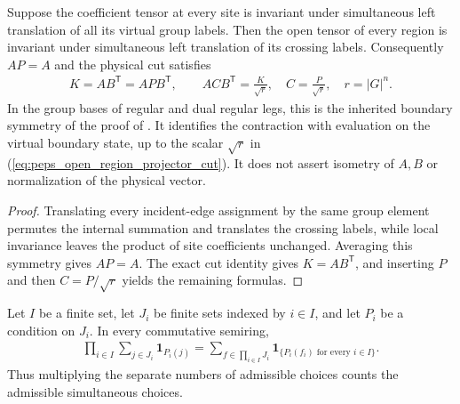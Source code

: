 \begin{lemma}%
    \label{thm:peps_regular_open_region_projector}
    \leanok
    Suppose the coefficient tensor at every site is invariant under
    simultaneous left translation of all its virtual group labels.
    Then the open tensor of every region is invariant under
    simultaneous left translation of its crossing labels. Consequently
    $AP=A$ and the physical cut satisfies
    \begin{align}
        K=AB^{\mathsf T}=APB^{\mathsf T},\qquad
        ACB^{\mathsf T}=\frac{K}{\sqrt r},
        \quad C=\frac P{\sqrt r},\quad r=|G|^n.
        \label{eq:peps_open_region_projector_cut}
    \end{align}
    In the group bases of regular and dual regular legs, this is the
    inherited boundary symmetry of the proof of
    \cite[Theorem~6.9]{Schuch2010PEPS}. It identifies the contraction
    with evaluation on the virtual boundary state, up to the scalar
    $\sqrt r$ in (\ref{eq:peps_open_region_projector_cut}). It does not assert isometry of $A,B$ or normalization of
    the physical vector.
\end{lemma}
\begin{proof}\leanok
    Translating every incident-edge assignment by the same group element
    permutes the internal summation and translates the crossing
    labels, while local invariance leaves the product of site coefficients
    unchanged. Averaging this symmetry gives $AP=A$. The exact cut
    identity gives $K=AB^{\mathsf T}$, and inserting $P$ and then
    $C=P/\sqrt r$ yields the remaining formulas.
\end{proof}

\begin{lemma}%
    \label{thm:peps_finite_indicator_sum}
    \leanok
    Let $I$ be a finite set, let $J_i$ be finite sets indexed by $i\in I$,
    and let $P_i$ be a condition on $J_i$. In every commutative semiring,
    \begin{align}
        \prod_{i\in I}\sum_{j\in J_i}\mathbf1_{P_i(j)}
        =\sum_{f\in\prod_{i\in I}J_i}
        \mathbf1_{\{P_i(f_i)\text{ for every }i\in I\}}.
    \end{align}
    Thus multiplying the separate numbers of admissible choices counts
    the admissible simultaneous choices.
\end{lemma}

